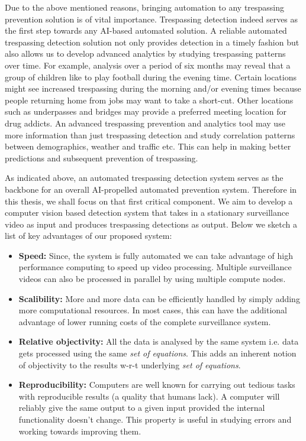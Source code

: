 Due to the above mentioned reasons, bringing automation to any trespassing prevention solution is of vital importance. Trespassing detection indeed serves as the first step towards any AI-based automated solution. A reliable automated trespassing detection solution  not only provides detection in a timely fashion but also allows us to develop advanced analytics by studying trespassing patterns over time. For example, analysis over a period of six months may reveal that a group of children like to play football during the evening time. Certain locations might see increased trespassing during the morning and/or evening times because people returning home from jobs may want to take a short-cut. Other locations such as underpasses and bridges may provide a preferred meeting location for drug addicts.  An advanced trespassing prevention and analytics tool may use more information than just trespassing detection and study correlation patterns between demographics, weather and traffic etc.  This can help in making better predictions and subsequent prevention of trespassing.

As indicated above, an automated trespassing detection system serves as the backbone for an overall AI-propelled automated prevention system. Therefore in this thesis, we shall focus on that first critical component. We aim to develop a computer vision based detection system that takes in a stationary surveillance video as  input and produces trespassing detections as output. Below we sketch a list of key advantages of our proposed system:


\begin{itemize}

\item \textbf{Speed:} Since, the system is fully automated we can take advantage of high performance computing to speed up video processing. Multiple surveillance videos can also be processed in parallel by using multiple compute nodes. 

\item \textbf{Scalibility:} More and more data can be efficiently handled by simply adding more computational resources. In most cases, this can have the additional advantage of lower running costs of the complete surveillance system.
 
\item \textbf{Relative objectivity:} All the data is analysed by the same system i.e. data gets processed using the same \textit{set of equations}. This adds an inherent notion of objectivity to the results w-r-t underlying \textit{set of equations}.

\item \textbf{Reproducibility:} Computers are well known for carrying out tedious tasks with reproducible results  (a quality that humans lack). A computer will reliably give the same output to a given input provided the internal functionality doesn't change. This property is useful in studying errors and working towards improving them.  
\end{itemize}

